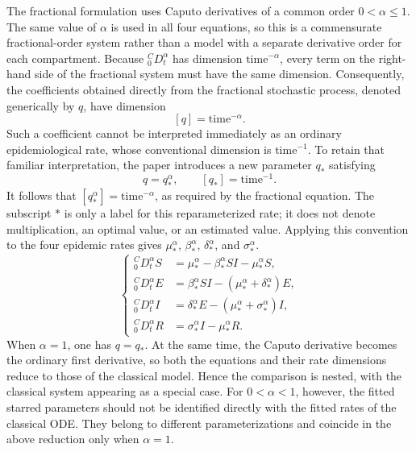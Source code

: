 \documentclass[00-main.tex]{subfiles}
\begin{document}
The fractional formulation uses Caputo derivatives of a common order $0<\alpha\leq1$.
The same value of $\alpha$ is used in all four equations, so this is a commensurate fractional-order system rather than a model with a separate derivative order for each compartment.
Because ${}_{0}^{C}\!D_t^{\alpha}$ has dimension $\mathrm{time}^{-\alpha}$, every term on the right-hand side of the fractional system must have the same dimension.
Consequently, the coefficients obtained directly from the fractional stochastic process, denoted generically by $q$, have dimension
\[
[q]=\mathrm{time}^{-\alpha}.
\]
Such a coefficient cannot be interpreted immediately as an ordinary epidemiological rate, whose conventional dimension is $\mathrm{time}^{-1}$.
To retain that familiar interpretation, the paper introduces a new parameter $q_*$ satisfying
\[
q=q_*^{\alpha},
\qquad
[q_*]=\mathrm{time}^{-1}.
\]
It follows that $[q_*^{\alpha}]=\mathrm{time}^{-\alpha}$, as required by the fractional equation.
The subscript $*$ is only a label for this reparameterized rate; it does not denote multiplication, an optimal value, or an estimated value.
Applying this convention to the four epidemic rates gives $\mu_*^{\alpha}$, $\beta_*^{\alpha}$, $\delta_*^{\alpha}$, and $\sigma_*^{\alpha}$.
\begin{equation}
\label{eq:ch3-fractional-seir}
\left\{
\begin{aligned}
{}_{0}^{C}\!D_t^{\alpha}S &= \mu_*^{\alpha}-\beta_*^{\alpha}SI-\mu_*^{\alpha}S,\\[3pt]
{}_{0}^{C}\!D_t^{\alpha}E &= \beta_*^{\alpha}SI-(\mu_*^{\alpha}+\delta_*^{\alpha})E,\\[3pt]
{}_{0}^{C}\!D_t^{\alpha}I &= \delta_*^{\alpha}E-(\mu_*^{\alpha}+\sigma_*^{\alpha})I,\\[3pt]
{}_{0}^{C}\!D_t^{\alpha}R &= \sigma_*^{\alpha}I-\mu_*^{\alpha}R.
\end{aligned}
\right.
\end{equation}
When $\alpha=1$, one has $q=q_*$.
At the same time, the Caputo derivative becomes the ordinary first derivative, so both the equations and their rate dimensions reduce to those of the classical model.
Hence the comparison is nested, with the classical system appearing as a special case.
For $0<\alpha<1$, however, the fitted starred parameters should not be identified directly with the fitted rates of the classical ODE.
They belong to different parameterizations and coincide in the above reduction only when $\alpha=1$.
\end{document}
